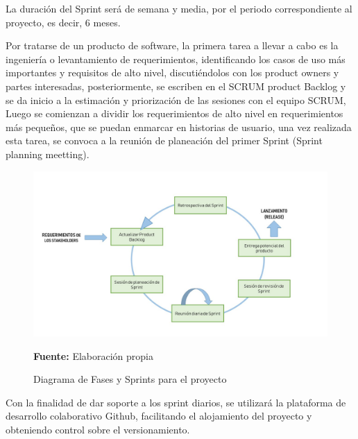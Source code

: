 La duración del Sprint será de semana y media, por el periodo correspondiente al proyecto, es decir, 6 meses.

Por tratarse de un producto de software, la primera tarea a llevar a cabo es la ingeniería o levantamiento de requerimientos, identificando los casos de uso más importantes y requisitos de alto nivel, discutiéndolos con los product owners y  partes interesadas, posteriormente, se escriben en el SCRUM product Backlog y se da inicio a la estimación y priorización de las sesiones con el equipo SCRUM, Luego se comienzan a dividir los requerimientos de alto nivel en requerimientos más pequeños, que se puedan enmarcar en historias de usuario, una vez realizada esta tarea, se convoca a la reunión de planeación del primer Sprint (Sprint planning meetting).

\begin{figure}[H]
    \centering
    \includegraphics[width=1\textwidth]{Anexos/LATEX/chapters/images/Scrum_1.jpg}
    \caption{Diagrama de Fases y Sprints para el proyecto}
    \small{\textbf{Fuente:} Elaboración propia}
    \label{SCRUM2}
\end{figure}

Con la finalidad de dar soporte a los sprint diarios, se utilizará la plataforma de desarrollo colaborativo Github, facilitando el alojamiento del proyecto y obteniendo control sobre el versionamiento.


